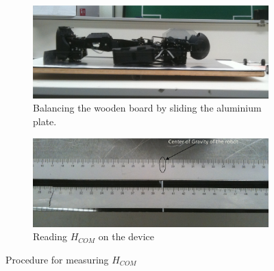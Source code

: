 \begin{figure}
\begin{subfigure}{.45\textwidth}
    \centering
    \includegraphics[width=\textwidth]{img/com-measurement-step3}
    \caption{Balancing the wooden board by sliding the aluminium plate.}
    \label{fig:com-measurement-3}
  \end{subfigure}
  \hfill
  \begin{subfigure}{.45\textwidth}
    \centering
    \includegraphics[width=\textwidth]{img/com-measurement-step4}
    \caption{Reading $H_{COM}$ on the device}
    \label{fig:com-measurement-4}
  \end{subfigure}
  \caption{Procedure for measuring $H_{COM}$}
\end{figure}